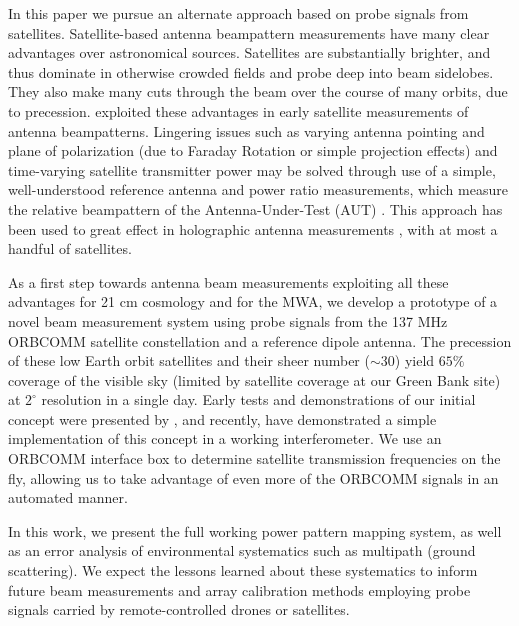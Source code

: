 In this paper we pursue an alternate approach based on probe signals from satellites. Satellite-based antenna beampattern measurements have many clear advantages over astronomical sources. Satellites are substantially brighter, and thus dominate in otherwise crowded fields and probe deep into beam sidelobes. They also make many cuts through the beam over the course of many orbits, due to precession. \citet{brueckmann63} exploited these advantages in early satellite measurements of antenna beampatterns. Lingering issues such as varying antenna pointing and plane of polarization (due to Faraday Rotation or simple projection effects) and time-varying satellite transmitter power may be solved through use of a simple, well-understood reference antenna and power ratio measurements, which measure the relative beampattern of the Antenna-Under-Test (AUT) \citep[eg.][]{fukao85, law97, hurtado2001, vlbamemo}. This approach has been used to great effect in holographic antenna measurements \citep{rochblatt92, harp2011, lasenby85, godwin86, deguchi93}, with at most a handful of satellites.

As a first step towards antenna beam measurements exploiting all these advantages for 21 cm cosmology and for the MWA, we develop a prototype of a novel beam measurement system using probe signals from the 137 MHz ORBCOMM satellite constellation and a reference dipole antenna. The precession of these low Earth orbit satellites and their sheer number ($\sim30$) yield $65\%$ coverage of the visible sky (limited by satellite coverage at our Green Bank site) at $2^\circ$ resolution in a single day. Early tests and demonstrations of our initial concept were presented by \citet{ries07, BradleyAndRies2008,CzekalaAndBradley2010,CzekalaAndBradley2010_2,aasposter}, and recently,  \citet{zheng14} have demonstrated a simple implementation of this concept in a working interferometer. We use an ORBCOMM interface box to determine satellite transmission frequencies on the fly, allowing us to take advantage of even more of the ORBCOMM signals in an automated manner.

In this work, we present the full working power pattern mapping system, as well as an error analysis of environmental systematics such as multipath (ground scattering). We expect the lessons learned about these systematics to inform future beam measurements and array calibration methods employing probe signals carried by remote-controlled drones or satellites. 

